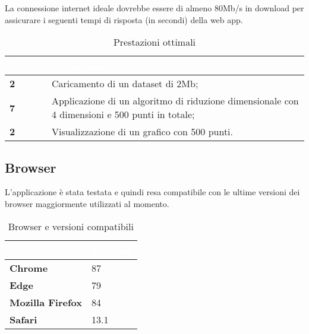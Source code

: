 La connessione internet ideale dovrebbe essere di almeno 80Mb/s in download per assicurare i seguenti tempi di risposta (in secondi) della web app. 
{
\setlength\arrayrulewidth{0.95pt}
\renewcommand{\arraystretch}{1.5}
\begin{longtable}{C{2cm} | C{10cm}}

\textcolor{white}{\textbf{Tempo}}&
\textcolor{white}{\textbf{Operazione}} \\
\endfirsthead
\endfoot
{}\caption{Prestazioni ottimali}
\endlastfoot
	
	\textbf{2} &
	Caricamento di un dataset di 2Mb;  \\
 
	\textbf{7} & 
	Applicazione di un algoritmo  di riduzione dimensionale con 4 dimensioni e 500 punti in totale; \\
	
	\textbf{2} &
	Visualizzazione di un grafico con 500 punti.  \\	
	
\end{longtable}	
}

\newpage

\subsection{Browser}
L'applicazione è stata testata e quindi resa compatibile con le ultime versioni dei browser maggiormente utilizzati al momento.
{
\setlength\arrayrulewidth{0.95pt}
\renewcommand{\arraystretch}{1.5}
\begin{longtable}{C{4cm} | C{4cm}}

\textcolor{white}{\textbf{Browser}}&
\textcolor{white}{\textbf{Versione}} \\
\endfirsthead
\endfoot
{}\caption{Browser e versioni compatibili}
\endlastfoot
	
	\textbf{Chrome} &
	 87 \\
 
	\textbf{Edge} & 
	79\\
	
	\textbf{Mozilla Firefox} &
	 84 \\
 
	\textbf{Safari} & 
	13.1 \\
	
\end{longtable}	
}
